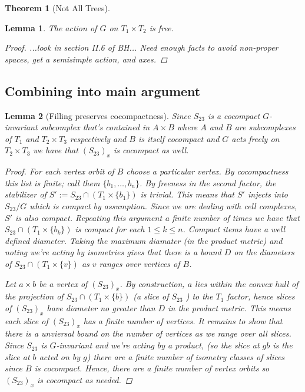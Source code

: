 \documentclass{article}
\theoremstyle{mystyle}
\newtheorem{thm}{Theorem}[section]
\newtheorem{lem}{Lemma}[section]
\theoremstyle{remark}
\begin{document}
\begin{thm}
    [Not All Trees]
\end{thm}

\begin{lem}
    The action of \(G\) on \(T_1 \times T_{2} \) is free.
    \begin{proof}
        ...look in section II.6 of BH... Need enough facts to avoid non-proper spaces, get a semisimple action, and axes.
    \end{proof}
\end{lem}

\subsection{Combining into main argument}
\begin{lem} 
[Filling preserves cocompactness]
\label{lem:fillingcocompact}
    Since $S_{23}$ is a cocompact $G$-invariant subcomplex that's contained in \(A \times B\) where \(A\) and \(B\) are subcomplexes of \(T_1\) and \(T_2 \times T_3\) respectively and \(B\) is itself cocompact and $G$ acts freely on $T_2\times T_3$ we have that $(S_{23})_x$ is cocompact as well. 
\begin{proof}
     For each vertex orbit of $B$ choose a particular vertex. By cocompactness this list is finite; call them $\{b_1,\ldots,b_n\}$. By freeness in the second factor, the stabilizer of $S' := S_{23} \cap (T_1 \times \{b_1\})$ is trivial. This means that $S'$ injects into $S_{23}/G$ which is compact by assumption. Since we are dealing with cell complexes, $S'$ is also compact. Repeating this argument a finite number of times we have that $S_{23}\cap (T_1\times \{b_k\})$ is compact for each \(1 \leq k \leq n \). Compact items have a well defined diameter. Taking the maximum diamater (in the product metric) and noting we're acting by isometries gives that there is a bound \(D\) on the diameters of \(S_{23} \cap (T_1\times \{v\})\) as \(v\) ranges over vertices of \(B\). 



    Let \(a \times b\) be a vertex of \((S_{23})_x\). By construction, \(a\) lies within the convex hull of the projection of \(S_{23} \cap (T_1\times \{b\})\) (a slice of \(S_{23}\) ) to the \(T_1\) factor, hence slices of \((S_{ 23 })_x\) have diameter no greater than \(D\) in the product metric. 
    This means each slice of \((S_{23})_x\) has a finite number of vertices. It remains to show that there is a unviersal bound on the number of vertices as we range over all slices. Since \(S_{23}\) is $G$-invariant and we're acting by a product, (so the slice at \(gb\) is the slice at \(b\) acted on by \(g\)) there are a finite number of isometry classes of slices since \(B\) is cocompact. Hence, there are a finite number of vertex orbits so \((S_{23})_x\) is cocompact as needed.
\end{proof}
\end{lem}
\end{document}
